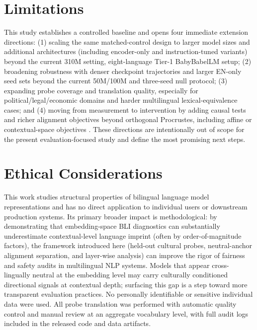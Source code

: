 \documentclass[11pt]{article}
\begin{document}
\newpage
\section*{Limitations}
\label{sec:limitations}

This study establishes a controlled baseline and opens four immediate extension directions: (1) scaling the same matched-control design to larger model sizes and additional architectures (including encoder-only and instruction-tuned variants) beyond the current 310M setting, eight-language Tier-1 BabyBabelLM setup; (2) broadening robustness with denser checkpoint trajectories and larger EN-only seed sets beyond the current 50M/100M and three-seed null protocol; (3) expanding probe coverage and translation quality, especially for political/legal/economic domains and harder multilingual lexical-equivalence cases; and (4) moving from measurement to intervention by adding causal tests and richer alignment objectives beyond orthogonal Procrustes, including affine or contextual-space objectives \citep{artetxe2019richly}. These directions are intentionally out of scope for the present evaluation-focused study and define the most promising next steps.

\section*{Ethical Considerations}
\label{sec:ethical}

This work studies structural properties of bilingual language model representations and has no direct application to individual users or downstream production systems. Its primary broader impact is methodological: by demonstrating that embedding-space BLI diagnostics can substantially underestimate contextual-level language imprint (often by order-of-magnitude factors), the framework introduced here (held-out cultural probes, neutral-anchor alignment separation, and layer-wise analysis) can improve the rigor of fairness and safety audits in multilingual NLP systems. Models that appear cross-lingually neutral at the embedding level may carry culturally conditioned directional signals at contextual depth; surfacing this gap is a step toward more transparent evaluation practices. No personally identifiable or sensitive individual data were used. All probe translation was performed with automatic quality control and manual review at an aggregate vocabulary level, with full audit logs included in the released code and data artifacts.

\FloatBarrier

\end{document}
